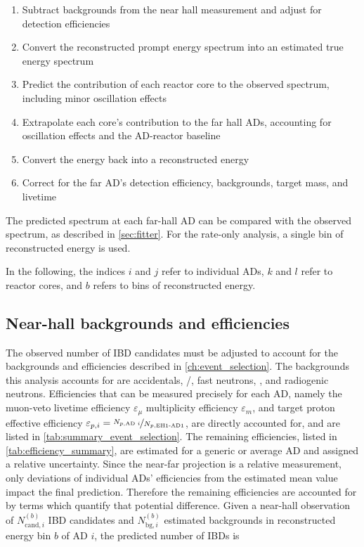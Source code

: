 \begin{enumerate}
    \item Subtract backgrounds from the near hall measurement
        and adjust for detection efficiencies
    \item Convert the reconstructed prompt energy spectrum
        into an estimated true \nuebar{} energy spectrum
    \item Predict the contribution of each reactor core
        to the observed \nuebar{} spectrum,
        including minor oscillation effects
    \item Extrapolate each core's contribution to the far hall ADs,
        accounting for oscillation effects and the AD-reactor baseline
    \item Convert the \nuebar{} energy back into a reconstructed energy
    \item Correct for the far AD's detection efficiency, backgrounds,
        target mass, and livetime
\end{enumerate}
The predicted spectrum at each far-hall AD can be compared
with the observed spectrum, as described in \cref{sec:fitter}.
For the rate-only analysis, a single bin of reconstructed energy is used.

In the following, the indices $i$ and $j$ refer to individual ADs,
$k$ and $l$ refer to reactor cores,
and $b$ refers to bins of reconstructed energy.

\subsection{Near-hall backgrounds and efficiencies}
\label{subsec:near_bg_eff}

The observed number of IBD candidates must be adjusted
to account for the backgrounds and efficiencies described in \cref{ch:event_selection}.
The backgrounds this analysis accounts for are
accidentals, \li{}/\he{}, fast neutrons, \amc{}, and radiogenic neutrons.
Efficiencies that can be measured precisely for each AD,
namely
the muon-veto livetime efficiency $\varepsilon_\mu$
multiplicity efficiency $\varepsilon_m$,
and target proton effective efficiency
$\varepsilon_{p,i}=\nicefrac{N_{p,\text{AD }i}}{N_{p,\text{EH1-AD1}}}$,
are directly accounted for,
and are listed in \cref{tab:summary_event_selection}.
The remaining efficiencies, listed in \cref{tab:efficiency_summary},
are estimated for a generic or average AD and assigned a relative uncertainty.
Since the near-far projection is a relative measurement,
only deviations of individual ADs' efficiencies from the estimated mean value
impact the final prediction.
Therefore the remaining efficiencies are accounted for
by terms which quantify that potential difference.
Given a near-hall observation of $N_{\text{cand},i}^{(b)}$ IBD candidates
and $N_{\text{bg},i}^{(b)}$ estimated backgrounds in reconstructed energy bin $b$
of AD $i$,
the predicted number of IBDs is

